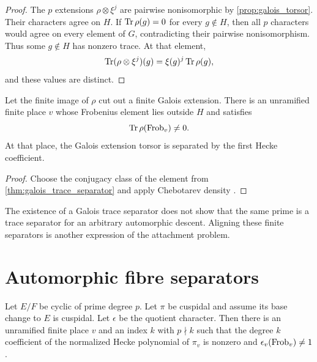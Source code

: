 \begin{proof}
The \(p\) extensions \(\rho\otimes\xi^j\) are pairwise nonisomorphic by \cref{prop:galois_torsor}. Their characters agree on \(H\). If \(\operatorname{Tr}\rho(g)=0\) for every \(g\notin H\), then all \(p\) characters would agree on every element of \(G\), contradicting their pairwise nonisomorphism. Thus some \(g\notin H\) has nonzero trace. At that element,
\[
 \operatorname{Tr}(\rho\otimes\xi^j)(g)
 =
 \xi(g)^j\operatorname{Tr}\rho(g),
\]
and these values are distinct.
\end{proof}

\begin{corollary}\label{cor:chebotarev_separator}
Let the finite image of \(\rho\) cut out a finite Galois extension. There is an unramified finite place \(v\) whose Frobenius element lies outside \(H\) and satisfies
\[
 \operatorname{Tr}\rho(\operatorname{Frob}_v)\neq0.
\]
At that place, the Galois extension torsor is separated by the first Hecke coefficient.
\end{corollary}

\begin{proof}
Choose the conjugacy class of the element from \cref{thm:galois_trace_separator} and apply Chebotarev density \cite{Neukirch1999}.
\end{proof}

\begin{remark}\label{rem:separator_mismatch}
The existence of a Galois trace separator does not show that the same prime is a trace separator for an arbitrary automorphic descent. Aligning these finite separators is another expression of the attachment problem.
\end{remark}

\section{Automorphic fibre separators}\label{sec:automorphic_separator}

\begin{theorem}\label{thm:automorphic_separator}
Let \(E/F\) be cyclic of prime degree \(p\). Let \(\pi\) be cuspidal and assume its base change to \(E\) is cuspidal. Let \(\epsilon\) be the quotient character. Then there is an unramified finite place \(v\) and an index \(k\) with \(p\nmid k\) such that the degree \(k\) coefficient of the normalized Hecke polynomial of \(\pi_v\) is nonzero and \(\epsilon_v(\operatorname{Frob}_v)\neq1\).
\end{theorem}

